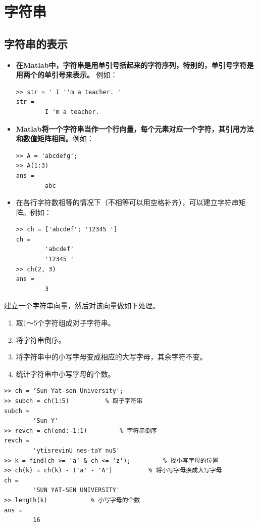 \section{字符串}
\subsection{字符串的表示}
\begin{itemize}
	\item \textbf{在Matlab中，字符串是用单引号括起来的字符序列，特别的，单引号字符是用两个的单引号来表示。}
	例如：
\begin{lstlisting}
>> str = ' I ''m a teacher. '
str =
		I 'm a teacher.
\end{lstlisting}
	\item \textbf{Matlab将一个字符串当作一个行向量，每个元素对应一个字符，其引用方法和数值矩阵相同。}例如：
\begin{lstlisting}
>> A = 'abcdefg';
>> A(1:3)
ans =
		abc
\end{lstlisting}

	\item 在各行字符数相等的情况下（不相等可以用空格补齐），可以建立字符串矩阵。例如：
	\begin{lstlisting}
>> ch = ['abcdef'; '12345 ']
ch =
		'abcdef'
		'12345 '
>> ch(2, 3)
ans =
		3
	\end{lstlisting}
\end{itemize}

\examples 建立一个字符串向量，然后对该向量做如下处理。
\begin{enumerate}[\hspace*{1em}(1)]
	\item 取1～5个字符组成对子字符串。
	\item 将字符串倒序。
	\item 将字符串中的小写字母变成相应的大写字母，其余字符不变。
	\item 统计字符串中小写字母的个数。
\end{enumerate}
\begin{lstlisting}
>> ch = 'Sun Yat-sen University';
>> subch = ch(1:5)			% 取子字符串
subch =
		'Sun Y'
>> revch = ch(end:-1:1)			% 字符串倒序
revch =
		'ytisrevinU nes-taY nuS'
>> k = find(ch >= 'a' & ch <= 'z');			% 找小写字母的位置
>> ch(k) = ch(k) - ('a' - 'A')			% 将小写字母换成大写字母
ch =
		'SUN YAT-SEN UNIVERSITY'
>> length(k)			% 小写字母的个数
ans =
		16
\end{lstlisting}

